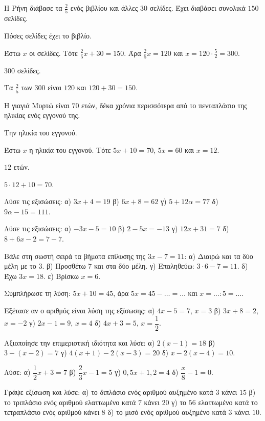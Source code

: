 \tixero Η Ρήνη διάβασε τα $\frac{2}{5}$ ενός βιβλίου και άλλες $30$ σελίδες. Έχει διαβάσει συνολικά $150$ σελίδες.\par
\tithelo Πόσες σελίδες έχει το βιβλίο.\par
\possindeo Έστω $x$ οι σελίδες. Τότε $\frac{2}{5}x+30=150$. Άρα $\frac{2}{5}x=120$ και $x=120\cdot\frac{5}{2}=300$.\par
\apantisi $300$ σελίδες.\par
\elegxos Τα $\frac{2}{5}$ των $300$ είναι $120$ και $120+30=150$.

\tixero Η γιαγιά Μυρτώ είναι $70$ ετών, δέκα χρόνια περισσότερα από το πενταπλάσιο της ηλικίας ενός εγγονού της.\par
\tithelo Την ηλικία του εγγονού.\par
\possindeo Έστω $x$ η ηλικία του εγγονού. Τότε $5x+10=70$, $5x=60$ και $x=12$.\par
\apantisi $12$ ετών.\par
\elegxos $5\cdot12+10=70$.



\ex Λύσε τις εξισώσεις: α) $3x+4=19$ \quad β) $6x+8=62$ \quad γ) $5+12\alpha=77$ \quad δ) $9\alpha-15=111$.

\ex Λύσε τις εξισώσεις: α) $-3x-5=10$ \quad β) $2-5x=-13$ \quad γ) $12x+31=7$ \quad δ) $8+6x-2=7-7$.

\ex Βάλε στη σωστή σειρά τα βήματα επίλυσης της $3x-7=11$: α) Διαιρώ και τα δύο μέλη με το $3$. \quad β) Προσθέτω $7$ και στα δύο μέλη. \quad γ) Επαληθεύω: $3\cdot6-7=11$. \quad δ) Έχω $3x=18$. \quad ε) Βρίσκω $x=6$.

\ex Συμπλήρωσε τη λύση: $5x+10=45$, άρα $5x=45-\dots=\dots$ και $x=\dots:5=\dots$.

\ex Εξέτασε αν ο αριθμός είναι λύση της εξίσωσης: α) $4x-5=7$, $x=3$ \quad β) $3x+8=2$, $x=-2$ \quad γ) $2x-1=9$, $x=4$ \quad δ) $4x+3=5$, $x=\dfrac{1}{2}$.

\ex Αξιοποίησε την επιμεριστική ιδιότητα και λύσε: α) $2(x-1)=18$ \quad β) $3-(x-2)=7$ \quad γ) $4(x+1)-2(x-3)=20$ \quad δ) $x-2(x-4)=10$.

\ex Λύσε: α) $\dfrac{1}{2}x+3=7$ \quad β) $\dfrac{2}{3}x-1=5$ \quad γ) $0{,}5x+1{,}2=4$ \quad δ) $\dfrac{x}{8}-1=0$.


\ex Γράψε εξίσωση και λύσε: α) το διπλάσιο ενός αριθμού αυξημένο κατά $3$ κάνει $15$ \quad β) το τριπλάσιο ενός αριθμού ελαττωμένο κατά $7$ κάνει $20$ \quad γ) το $56$ ελαττωμένο κατά το τετραπλάσιο ενός αριθμού κάνει $8$ \quad δ) το μισό ενός αριθμού αυξημένο κατά $3$ κάνει $10$.

